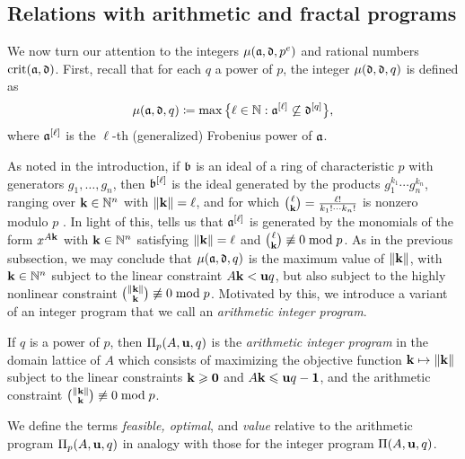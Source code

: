 \documentclass[11pt]{amsart}
\begin{document}
\subsection{Relations with arithmetic and fractal programs}

 We now turn our attention to the integers $\mu(\mathfrak{a}, \mathfrak{d}, p^e)$ and rational numbers $\operatorname{crit}(\mathfrak{a},\mathfrak{d})$.  First, recall that for each $q$ a power of $p$, the integer $\mu(\mathfrak{d}, \mathfrak{d}, q)$ is defined as 
\[\mu(\mathfrak{a},\mathfrak{d},q) \coloneqq \max\big\{ \ell \in \mathbb{N} : \mathfrak{a}^{[\ell]} \not\subseteq \mathfrak{d}^{[q]}\big\},\]
where $\mathfrak{a}^{[\ell]}$ is the $\ell$-th (generalized) Frobenius power of $\mathfrak{a}$.

As noted in the introduction, if $\mathfrak{b}$ is an ideal of a ring of characteristic $p$ with generators $g_1, \ldots, g_n$, then $\mathfrak{b}^{[\ell]}$ is the ideal generated by the products $g_1^{k_1}\cdots g_n^{k_n}$, ranging over $\mathbf{k} \in \mathbb{N}^n$ with $\| \mathbf{k} \|=\ell$, and for which  $\binom{\ell}{\mathbf{k}} =
\frac{\ell!}{k_1 ! \cdots k_n !}$ is nonzero modulo $p$  \cite[Proposition~3.5]{hernandez+etal.frobenius_powers}.
In light of this,  tells us that $\mathfrak{a}^{[\ell]}$ is generated by the monomials of the form $x^{A \mathbf{k}}$ with $\mathbf{k} \in \mathbb{N}^n$ satisfying $\| \mathbf{k} \|=\ell$ and $\binom{\ell}{\mathbf{k}} \not\equiv 0 \bmod p$.  As in the previous subsection, we may conclude that $\mu(\mathfrak{a},\mathfrak{d},q)$ is the maximum value of $\| \mathbf{k} \|$, with $\mathbf{k} \in \mathbb{N}^n$ subject to the linear constraint $A\mathbf{k} < \mathbf{u}q$, but also subject to the highly nonlinear constraint $\binom{\| \mathbf{k} \|}{\mathbf{k}} \not\equiv 0 \bmod{p}$.  Motivated by this, we introduce a variant of an integer program that we call an \emph{arithmetic integer program}.

\begin{definition}
\label{aip: D}
If $q$ is a power of $p$, then $\Pi_p(A, \mathbf{u}, q)$ is the \emph{arithmetic integer program} in the domain lattice of $A$ which consists of maximizing the objective function $\mathbf{k} \mapsto \| \mathbf{k} \|$ subject to the linear constraints $\mathbf{k} \geqslant \mathbf{0}$ and $A \mathbf{k} \leqslant \mathbf{u}q - \mathbf{1}$, and the arithmetic constraint $\binom{\| \mathbf{k} \|}{\mathbf{k}} \not \equiv 0 \bmod p$.
\end{definition}

We define the terms \emph{feasible, optimal}, and \emph{value} relative to the arithmetic program $\Pi_p(A, \mathbf{u}, q)$ in analogy with those for the integer program $\Pi(A, \mathbf{u}, q)$.
\end{document}
